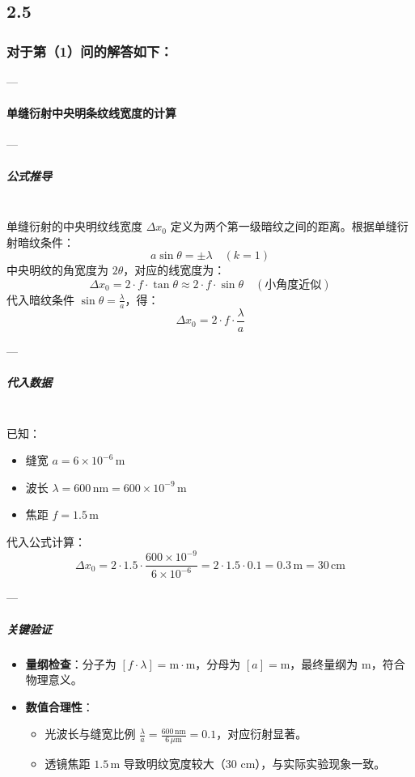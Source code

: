 \documentclass{article}
\begin{document}
{\subsection*{2.5}

\subsubsection*{对于第（1）问的解答如下：}

---

\paragraph*{单缝衍射中央明条纹线宽度的计算}

---

\subparagraph*{公式推导} \mbox{} \\

单缝衍射的中央明纹线宽度 \(\Delta x_0\) 定义为两个第一级暗纹之间的距离。根据单缝衍射暗纹条件：  
\[
a \sin\theta = \pm \lambda \quad (k=1)
\]  
中央明纹的角宽度为 \(2\theta\)，对应的线宽度为：  
\[
\Delta x_0 = 2 \cdot f \cdot \tan\theta \approx 2 \cdot f \cdot \sin\theta \quad (\text{小角度近似})
\]  
代入暗纹条件 \(\sin\theta = \frac{\lambda}{a}\)，得：  
\[
\Delta x_0 = 2 \cdot f \cdot \frac{\lambda}{a}
\]

---

\subparagraph*{代入数据} \mbox{} \\

已知：  
\begin{itemize}
    \item 缝宽 \(a = 6 \times 10^{-6} \, \text{m}\)  
    \item 波长 \(\lambda = 600 \, \text{nm} = 600 \times 10^{-9} \, \text{m}\)  
    \item 焦距 \(f = 1.5 \, \text{m}\)  
\end{itemize}

代入公式计算：  
\[
\Delta x_0 = 2 \cdot 1.5 \cdot \frac{600 \times 10^{-9}}{6 \times 10^{-6}} = 2 \cdot 1.5 \cdot 0.1 = 0.3 \, \text{m} = 30 \, \text{cm}
\]

---

\subparagraph*{关键验证}

\begin{itemize}
    \item \textbf{量纲检查}：分子为 \([f \cdot \lambda] = \text{m} \cdot \text{m}\)，分母为 \([a] = \text{m}\)，最终量纲为 \(\text{m}\)，符合物理意义。  
    \item \textbf{数值合理性}：  
    \begin{itemize}
        \item 光波长与缝宽比例 \(\frac{\lambda}{a} = \frac{600 \, \text{nm}}{6 \, \mu\text{m}} = 0.1\)，对应衍射显著。  
        \item 透镜焦距 \(1.5 \, \text{m}\) 导致明纹宽度较大（30 cm），与实际实验现象一致。
    \end{itemize}
\end{itemize}

}
\end{document}
